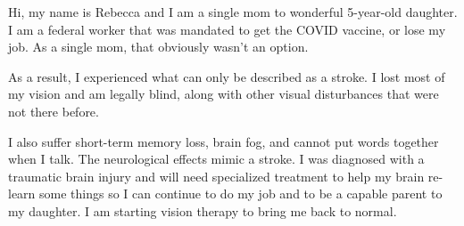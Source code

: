 Hi, my name is Rebecca and I am a single mom to wonderful 5-year-old daughter. I
am a federal worker that was mandated to get the COVID vaccine, or lose my
job. As a single mom, that obviously wasn’t an option.

As a result, I experienced what can only be described as a stroke. I lost most
of my vision and am legally blind, along with other visual disturbances that
were not there before.

I also suffer short-term memory loss, brain fog, and cannot put words together
when I talk. The neurological effects mimic a stroke. I was diagnosed with a
traumatic brain injury and will need specialized treatment to help my brain
re-learn some things so I can continue to do my job and to be a capable parent
to my daughter. I am starting vision therapy to bring me back to normal.
